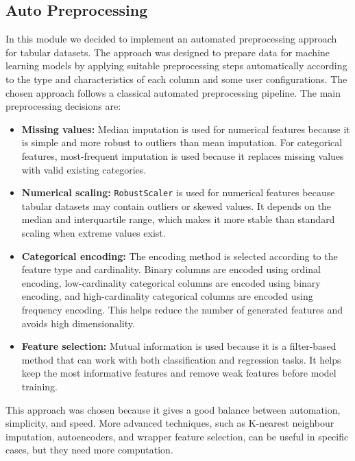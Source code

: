 \documentclass[12pt,a4paper]{report}
\begin{document}
\subsection{Auto Preprocessing}
In this module we decided to implement an automated preprocessing approach for tabular datasets. The
approach was designed to prepare data for machine learning models by applying
suitable preprocessing steps automatically according to the type and
characteristics of each column and some user configurations.
\noindent The chosen approach follows a classical automated preprocessing pipeline. The
main preprocessing decisions are:

\begin{itemize}
  \item \textbf{Missing values:} Median imputation is used for numerical
  features because it is simple and more robust to outliers than mean
  imputation. For categorical features, most-frequent imputation is used because
  it replaces missing values with valid existing categories.

  \item \textbf{Numerical scaling:} \texttt{RobustScaler} is used for numerical
  features because tabular datasets may contain outliers or skewed values. It
  depends on the median and interquartile range, which makes it more stable than
  standard scaling when extreme values exist.

  \item \textbf{Categorical encoding:} The encoding method is selected according
  to the feature type and cardinality. Binary columns are encoded using ordinal
  encoding, low-cardinality categorical columns are encoded using binary
  encoding, and high-cardinality categorical columns are encoded using frequency
  encoding. This helps reduce the number of generated features and avoids high
  dimensionality.

  \item \textbf{Feature selection:} Mutual information is used because it is a
  filter-based method that can work with both classification and regression
  tasks. It helps keep the most informative features and remove weak features
  before model training.
\end{itemize}

\noindent This approach was chosen because it gives a good balance between automation,
simplicity, and speed. More advanced techniques, such as
K-nearest neighbour imputation, autoencoders, and wrapper feature selection, can
be useful in specific cases, but they need more computation.
\end{document}
